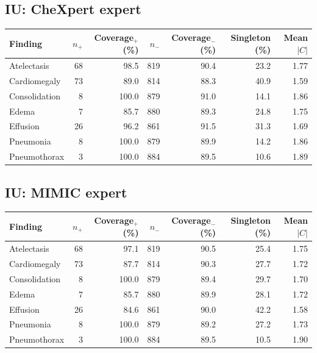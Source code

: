\subsection{IU: CheXpert expert}
\begin{center}\small
\begin{tabular}{lrrrrrr}
\toprule
Finding & $n_+$ & Coverage$_+$ (\%) & $n_-$ & Coverage$_-$ (\%) & Singleton (\%) & Mean $|C|$\\
\midrule
Atelectasis & 68 & 98.5 & 819 & 90.4 & 23.2 & 1.77\\
Cardiomegaly & 73 & 89.0 & 814 & 88.3 & 40.9 & 1.59\\
Consolidation & 8 & 100.0 & 879 & 91.0 & 14.1 & 1.86\\
Edema & 7 & 85.7 & 880 & 89.3 & 24.8 & 1.75\\
Effusion & 26 & 96.2 & 861 & 91.5 & 31.3 & 1.69\\
Pneumonia & 8 & 100.0 & 879 & 89.9 & 14.2 & 1.86\\
Pneumothorax & 3 & 100.0 & 884 & 89.5 & 10.6 & 1.89\\
\bottomrule\end{tabular}\end{center}
\subsection{IU: MIMIC expert}
\begin{center}\small
\begin{tabular}{lrrrrrr}
\toprule
Finding & $n_+$ & Coverage$_+$ (\%) & $n_-$ & Coverage$_-$ (\%) & Singleton (\%) & Mean $|C|$\\
\midrule
Atelectasis & 68 & 97.1 & 819 & 90.5 & 25.4 & 1.75\\
Cardiomegaly & 73 & 87.7 & 814 & 90.3 & 27.7 & 1.72\\
Consolidation & 8 & 100.0 & 879 & 89.4 & 29.7 & 1.70\\
Edema & 7 & 85.7 & 880 & 89.9 & 28.1 & 1.72\\
Effusion & 26 & 84.6 & 861 & 90.0 & 42.2 & 1.58\\
Pneumonia & 8 & 100.0 & 879 & 89.2 & 27.2 & 1.73\\
Pneumothorax & 3 & 100.0 & 884 & 89.5 & 10.5 & 1.90\\
\bottomrule\end{tabular}\end{center}